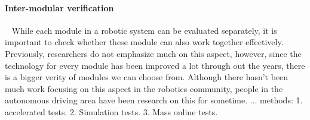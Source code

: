 \paragraph{Inter-modular verification}~
While each module in a robotic system can be evaluated separately, it is important to check whether these module can also work together effectively. Previously, researchers do not emphasize much on this aspect, however, since the technology for every module has been improved a lot through out the years, there is a bigger verity of modules we can choose from. Although there hasn't been much work focusing on this aspect in the robotics community, people in the autonomous driving area have been research on this for sometime. ...    
methods: 1. accelerated tests. 2. Simulation tests. 3. Mass online tests.

